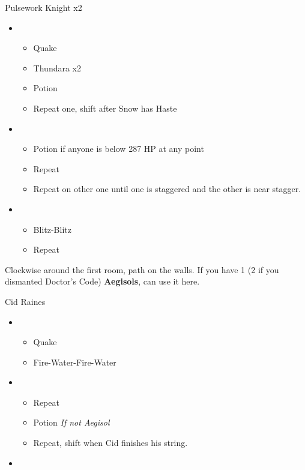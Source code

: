 \begin{multicols}{2}
\begin{battle}{Pulsework Knight x2}
\begin{itemize}
    \item \first
    \begin{itemize}
        \item Quake
        \item Thundara x2
        \item Potion
	\item Repeat one, shift after Snow has Haste
    \end{itemize}
    \item \second
    \begin{itemize}
	\item Potion if anyone is below 287 HP at any point
        \item Repeat
        \item Repeat on other one until one is staggered and the other is near stagger.
    \end{itemize}
    \item \sixth
    \begin{itemize}
        \item Blitz-Blitz
        \item Repeat
    \end{itemize}
\end{itemize}
\end{battle}
Clockwise around the first room, path on the walls.
If you have 1 (2 if you dismanted Doctor's Code) \textbf{Aegisols}, can use it here.
\begin{battle}{Cid Raines}
\begin{itemize}
    \item \first
    \begin{itemize}
        \item Quake
        \item Fire-Water-Fire-Water
    \end{itemize}
    \item \third
    \begin{itemize}
        \item Repeat
        \item Potion \textit{If not Aegisol}
        \item Repeat, shift when Cid finishes his string.
    \end{itemize}
    \item \fifth

\end{itemize}
\end{battle}
\end{multicols}
